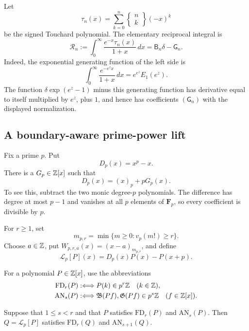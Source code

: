 Let
\begin{equation}\label{eq:signed-touchard}
 \tau_n(x)=\sum_{k=0}^n
 \left\{\begin{matrix}n\\k\end{matrix}\right\}(-x)^k
\end{equation}
be the signed Touchard polynomial.  The elementary reciprocal integral is
\begin{equation}\label{eq:touchard-remainder}
 \mathscr R_n
 :=\int_0^\infty\frac{e^{-x}\tau_n(x)}{1+x}\,dx
 =\mathsf B_n\delta-\mathsf G_n.
\end{equation}
Indeed, the exponential generating function of the left side is
\[
 \int_0^\infty\frac{e^{-e^z x}}{1+x}\,dx
 =e^{e^z}E_1(e^z).
\]
The function \(\delta\exp(e^z-1)\) minus this generating function has
derivative equal to itself multiplied by \(e^z\), plus \(1\), and hence has coefficients
\((\mathsf G_n)\) with the displayed normalization.

\subsection{A boundary-aware prime-power lift}

Fix a prime \(p\).  Put
\[
 D_p(x)=x^p-x.
\]
There is a \(G_p\in\mathbb Z[x]\) such that
\begin{equation}\label{eq:dp-falling}
 D_p(x)=(x)_p+pG_p(x).
\end{equation}
To see this, subtract the two monic degree-\(p\) polynomials.  The difference
has degree at most \(p-1\) and vanishes at all \(p\) elements of
\(\mathbf F_p\), so every coefficient is divisible by \(p\).

For \(r\geq1\), set
\[
 m_{p,r}=\min\{m\geq0:v_p(m!)\geq r\}.
\]
Choose \(a\in\mathbb Z\), put \(W_{p,r,a}(x)=(x-a)_{m_{p,r}}\), and define
\begin{equation}\label{eq:touchard-lift-operator}
 \mathcal L_p[P](x)=D_p(x)P(x)-P(x+p).
\end{equation}

For a polynomial \(P\in\mathbb Z[x]\), use the abbreviations
\begin{align*}
 \mathrm{FD}_r(P)&:\Longleftrightarrow
      P(k)\in p^r\mathbb Z\quad(k\in\mathbb Z),\\
 \mathrm{AN}_s(P)&:\Longleftrightarrow
      \mathfrak B(Pf),\mathfrak G(Pf)\in p^s\mathbb Z
      \quad(f\in\mathbb Z[x]).
\end{align*}

\begin{lemma}
\label{lem:touchard-one-step}
Suppose that \(1\leq s<r\) and that \(P\) satisfies
\(\mathrm{FD}_r(P)\) and \(\mathrm{AN}_s(P)\).  Then
\(Q=\mathcal L_p[P]\) satisfies
\(\mathrm{FD}_r(Q)\) and \(\mathrm{AN}_{s+1}(Q)\).
\end{lemma}

